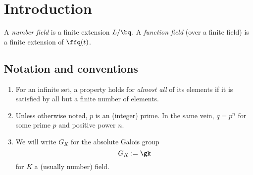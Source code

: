 \chapter*{Introduction}

A \textit{number field} is a finite extension $L/\bq$. A \textit{function field} (over a finite field) is a finite extension of $\ffq(t)$.

\section*{Notation and conventions}
\begin{enumerate}
\item For an infinite set, a property holds for \textit{almost all} of its
  elements if it is satisfied by all but a finite number of elements.
\item Unless otherwise noted, $p$ is an (integer) prime. In the same vein, $q=
  p^n$ for some prime $p$ and positive power $n$.
\item We will write $G_K$ for the absolute Galois group
  \[ G_K := \gk \]
  for $K$ a (usually number) field.
\end{enumerate}
